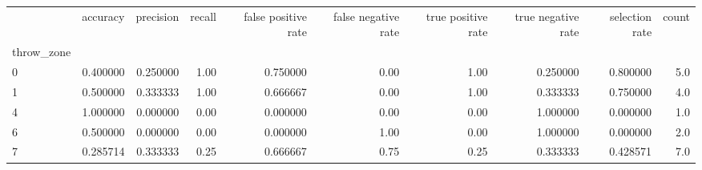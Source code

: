 \begin{tabular}{lrrrrrrrrr}
\toprule
{} &  accuracy &  precision &  recall &  false positive rate &  false negative rate &  true positive rate &  true negative rate &  selection rate &  count \\
throw\_zone &           &            &         &                      &                      &                     &                     &                 &        \\
\midrule
0          &  0.400000 &   0.250000 &    1.00 &             0.750000 &                 0.00 &                1.00 &            0.250000 &        0.800000 &    5.0 \\
1          &  0.500000 &   0.333333 &    1.00 &             0.666667 &                 0.00 &                1.00 &            0.333333 &        0.750000 &    4.0 \\
4          &  1.000000 &   0.000000 &    0.00 &             0.000000 &                 0.00 &                0.00 &            1.000000 &        0.000000 &    1.0 \\
6          &  0.500000 &   0.000000 &    0.00 &             0.000000 &                 1.00 &                0.00 &            1.000000 &        0.000000 &    2.0 \\
7          &  0.285714 &   0.333333 &    0.25 &             0.666667 &                 0.75 &                0.25 &            0.333333 &        0.428571 &    7.0 \\
\bottomrule
\end{tabular}
